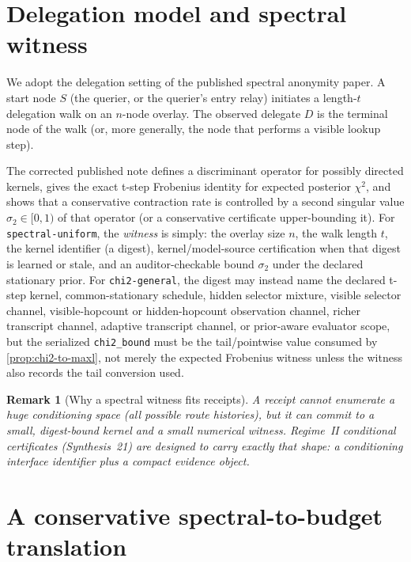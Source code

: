 \documentclass[11pt]{article}
\newtheorem{remark}{Remark}
\begin{document}
\section{Delegation model and spectral witness}
\label{sec:model}

We adopt the delegation setting of the published spectral anonymity paper.\cite{series:spectral}
A start node $S$ (the querier, or the querier's entry relay) initiates a length-$t$ delegation walk on an $n$-node overlay.
The observed delegate $D$ is the terminal node of the walk (or, more generally, the node that performs a visible lookup step).

The corrected published note defines a discriminant operator for possibly directed kernels, gives the exact t-step Frobenius identity for expected posterior $\chi^2$, and shows that a conservative contraction rate is controlled by a
second singular value $\sigma_2\in[0,1)$ of that operator (or a conservative certificate upper-bounding it).\cite{series:spectral}
For \texttt{spectral-uniform}, the \emph{witness} is simply: the overlay size $n$, the walk length $t$, the kernel identifier (a digest), kernel/model-source certification when that digest is learned or stale, and an auditor-checkable bound $\sigma_2$ under the declared stationary prior. For \texttt{chi2-general}, the digest may instead name the declared t-step kernel, common-stationary schedule, hidden selector mixture, visible selector channel, visible-hopcount or hidden-hopcount observation channel, richer transcript channel, adaptive transcript channel, or prior-aware evaluator scope, but the serialized \texttt{chi2\_bound} must be the tail/pointwise value consumed by \cref{prop:chi2-to-maxl}, not merely the expected Frobenius witness unless the witness also records the tail conversion used.

\begin{remark}[Why a spectral witness fits receipts]
A receipt cannot enumerate a huge conditioning space (all possible route histories), but it \emph{can} commit to a small, digest-bound kernel and a small numerical witness.
Regime~II conditional certificates (Synthesis~21) are designed to carry exactly that shape: a conditioning interface identifier plus a compact evidence object.\cite{series:condcert}
\end{remark}


\section{A conservative spectral-to-budget translation}
\label{sec:translation}
\end{document}
